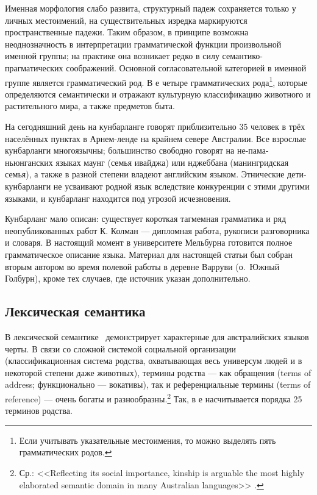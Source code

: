 Именная морфология слабо развита, структурный падеж сохраняется только у личных местоимений, на существительных изредка маркируются пространственные падежи. Таким образом, в принципе возможна неоднозначность в интерпретации грамматической функции произвольной именной группы; на практике она возникает редко в силу семантико-прагматических соображений. Основной согласовательной категорией в именной группе является грамматический род. В  е четыре грамматических рода\footnote{Если учитывать указательные местоимения, то можно выделять пять грамматических родов.}, которые определяются семантически и отражают культурную классификацию животного и растительного мира, а также предметов быта.

На сегодняшний день на кунбарланге говорят приблизительно 35 человек в трёх населённых пунктах в Арнем-ленде на крайнем севере Австралии. Все взрослые кунбарланги многоязычны; большинство свободно говорят на не-пама-ньюнганских языках маунг (семья ивайджа) или нджеббана (манингридская семья), а также в разной степени владеют английским языком. Этнические дети-кунбарланги не усваивают родной язык вследствие конкуренции с этими другими языками, и кунбарланг находится под угрозой исчезновения.

Кунбарланг мало описан: существует короткая тагмемная грамматика\autocite{harris69} и ряд неопубликованных работ К. Колман --- дипломная работа\autocite{coleman82}, рукописи разговорника\autocite{wordgra} и словаря\autocite{coleman10}. В настоящий момент в университете Мельбурна готовится полное грамматическое описание языка\autocite{ikwlg}.  Материал для настоящей статьи был собран вторым автором во время полевой работы в деревне Варруви (о.\ Южный Голбурн), кроме тех случаев, где источник указан дополнительно.

\subsection{Лексическая семантика}
\label{sec:lexsemover}
В лексической семантике \ демонстрирует характерные для австралийских языков черты. В связи со сложной системой социальной организации (классификационная система родства, охватывающая весь универсум людей и в некоторой степени даже животных), термины родства --- как обращения (terms of address; функционально --- вокативы), так и референциальные термины (terms of reference) --- очень богаты и разнообразны.\footnote{Ср.: <<Reflecting its social importance, kinship is arguable the most highly elaborated semantic domain in many Australian languages>> \autocite[304]{gabysinger14}.} Так, в  е насчитывается порядка 25 терминов родства.

